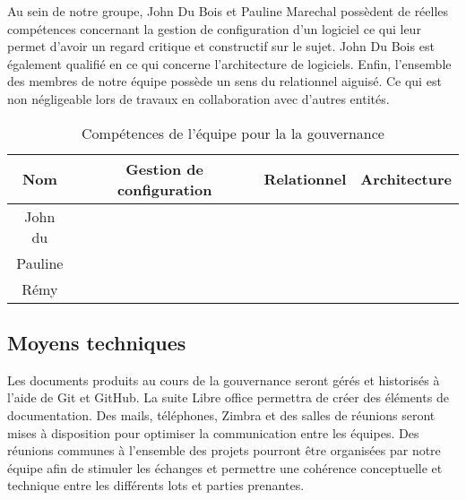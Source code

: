 	Au sein de notre groupe, John Du Bois et Pauline Marechal possèdent de réelles compétences concernant la gestion de configuration d’un logiciel ce qui leur permet d’avoir un regard critique et constructif sur le sujet. John Du Bois est également qualifié en ce qui concerne l’architecture de logiciels. Enfin, l’ensemble des membres de notre équipe possède un sens du relationnel aiguisé. Ce qui est non négligeable lors de travaux en collaboration avec d’autres entités.
	
	\begin{table}[H]
		\centering
		\begin{tabular}{|c|c|c|c|}
			\hline
			\textbf{Nom} & \textbf{Gestion de configuration} & \textbf{Relationnel} & \textbf{Architecture}\\
			\hline
			John du \bsc{Bois} & \checkmark & \checkmark &\checkmark\\
			\hline
			Pauline \bsc{Marechal} & \checkmark  & \checkmark&\\
			\hline
			Rémy \bsc{Stukof} & &\checkmark  &\\
			\hline
		\end{tabular}
		\caption{Compétences de l'équipe pour la la gouvernance}
		\label{table:competences6}
	\end{table}
	
	
	\subsection{Moyens techniques}	
	Les documents produits au cours de la gouvernance seront gérés et historisés à l’aide de Git et GitHub. La suite Libre office permettra de créer des éléments de documentation.
	Des mails, téléphones, Zimbra et des salles de réunions seront mises à disposition pour optimiser la communication entre les équipes. Des réunions communes à l’ensemble des projets pourront être organisées par notre équipe afin de stimuler les échanges et permettre une cohérence conceptuelle et technique entre les différents lots et parties prenantes. 